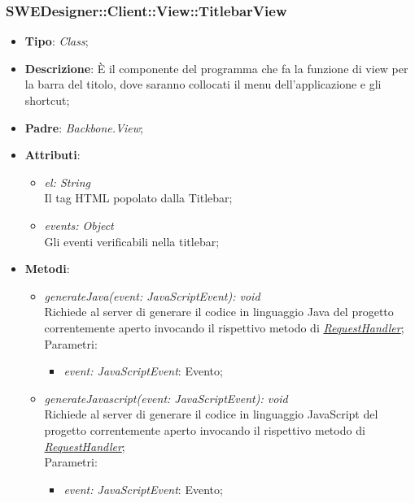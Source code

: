 \documentclass[../DefinizioneDiProdotto.tex]{subfiles}
\begin{document}
				\subsubsection{SWEDesigner::Client::View::TitlebarView}
					\hypertarget{SWEDesigner::Client::View::TitlebarView}{}
					\begin{itemize}
						\item \textbf{Tipo}: \emph{Class};
						\item \textbf{Descrizione}: È il componente del programma che fa la funzione di view per la barra del titolo, dove saranno collocati il menu dell’applicazione e gli shortcut;
						\item \textbf{Padre}: \emph{Backbone.View};
						\item \textbf{Attributi}:
						\begin{itemize}
							\item \emph{el: String} \\
							Il tag HTML popolato dalla Titlebar;
							\item \emph{events: Object} \\
							Gli eventi verificabili nella titlebar;
						\end{itemize}
						\item \textbf{Metodi}:
						\begin{itemize}
							\item \emph{generateJava(event: JavaScriptEvent): void} \\
							Richiede al server di generare il codice in linguaggio Java del progetto correntemente aperto invocando il rispettivo metodo di \hyperlink{SWEDesigner::Model::RequestHandler}{\emph{RequestHandler}}; \\
							Parametri:
							\begin{itemize}
								\item \emph{event: JavaScriptEvent}: Evento;
							\end{itemize}
							\item \emph{generateJavascript(event: JavaScriptEvent): void} \\
							Richiede al server di generare il codice in linguaggio JavaScript del progetto correntemente aperto invocando il rispettivo metodo di \hyperlink{SWEDesigner::Model::RequestHandler}{\emph{RequestHandler}}; \\
							Parametri:
							\begin{itemize}
								\item \emph{event: JavaScriptEvent}: Evento;
							\end{itemize}

\end{itemize}
\end{itemize}
\end{document}
